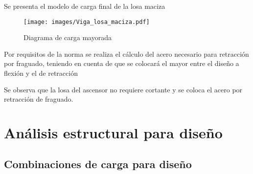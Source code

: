 \documentclass[12pt]{article}
\begin{document}


Se presenta el modelo de carga final de la losa maciza

\begin{figure}[H]
    \centering
    \texttt{[image: images/Viga\_losa\_maciza.pdf]}
    \caption{Diagrama de carga mayorada}
    \label{fig:Carga_Losa_Mayorada}
\end{figure}



Por requisitos de la norma se realiza el cálculo del acero necesario para retracción por fraguado, teniendo en cuenta de que se colocará el mayor entre el diseño a flexión y el de retracción





Se observa que la losa del ascensor no requiere cortante y se coloca el acero por retracción de fraguado.

\section{Análisis estructural para diseño}
\subsection{Combinaciones de carga para diseño}
\end{document}
